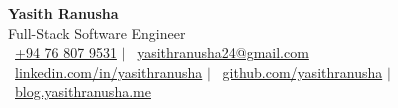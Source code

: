 \begin{center}
  \textbf{\Huge Yasith Ranusha}\\
  \vspace{2pt}
  {\Large Full-Stack Software Engineer}\\
  \vspace{4pt}
  \small \phoneicon\ \href{tel:+94768079531}{+94 76 807 9531} $|$
  \emailicon\ \href{mailto:yasithranusha24@gmail.com}{yasithranusha24@gmail.com}\\
  \vspace{2pt}
  \linkedinicon\ \href{https://www.linkedin.com/in/yasithranusha}{linkedin.com/in/yasithranusha} $|$
  \githubicon\ \href{https://github.com/yasithranusha}{github.com/yasithranusha} $|$
  \globeicon\ \href{https://blog.yasithranusha.me}{blog.yasithranusha.me}
\end{center}
